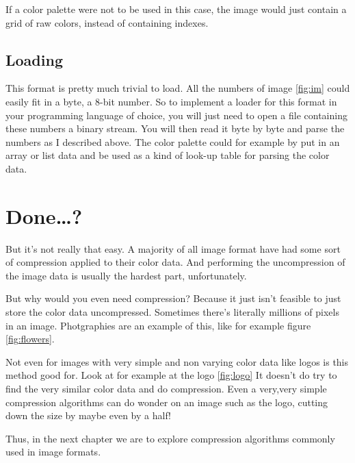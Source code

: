 \begin{refsection}
  If a color palette were not to be used in this case, the image would
  just contain a grid of raw colors, instead of containing indexes.

  \subsection{Loading}
  \label{sec:loading}

  This format is pretty much trivial to load. All the numbers of
  image \ref{fig:im} could easily fit in a byte, a 8-bit number. So to
  implement a loader for this format in your programming language of
  choice, you will just need to open a file containing these numbers a
  binary stream. You will then read it byte by byte and parse the
  numbers as I described above. The color palette could for example by
  put in an array or list data and be used as a kind of look-up table
  for parsing the color data.

  \section{Done\dots?}
  \label{sec:done}

  But it's not really that easy. A majority of all image format have
  had some sort of compression applied to their color data. And
  performing the uncompression of the image data is usually the
  hardest part, unfortunately.

  But why would you even need compression?  Because it just isn't
  feasible to just store the color data uncompressed. Sometimes
  there's literally millions of pixels in an image. Photgraphies are
  an example of this, like for example figure \ref{fig:flowers}.

  Not even for images with very simple and non varying color data like
  logos is this method good for. Look at for example at the logo
  \ref{fig:logo} It doesn't do try to find the very similar color data
  and do compression. Even a very,very simple compression algorithms
  can do wonder on an image such as the logo,  cutting down the size by
  maybe even by a half!

  Thus, in the next chapter we are to explore compression algorithms
  commonly used in image formats.


  \begin{figure}[h!]
    \centering
    \newcommand{\shieldcolor}{red}
\end{figure}
\end{refsection}
